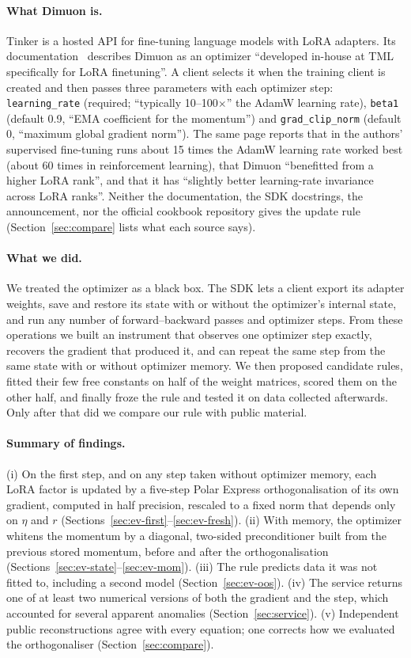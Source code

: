 \documentclass[11pt]{article}
\begin{document}
\paragraph{What Dimuon is.} Tinker is a hosted API for fine-tuning language models with LoRA
adapters. Its documentation~\cite{tinkerdocs} describes Dimuon as an optimizer ``developed
in-house at TML specifically for LoRA finetuning''. A client selects it when the training client is
created and then passes three parameters with each optimizer step: \texttt{learning\_rate}
(required; ``typically 10--100$\times$'' the AdamW learning rate), \texttt{beta1} (default 0.9,
``EMA coefficient for the momentum'') and \texttt{grad\_clip\_norm} (default 0, ``maximum global
gradient norm''). The same page reports that in the authors' supervised fine-tuning runs about
15 times the AdamW learning rate worked best (about 60 times in reinforcement learning), that Dimuon
``benefitted from a higher LoRA rank'', and that it has ``slightly better learning-rate invariance
across LoRA ranks''. Neither the documentation, the SDK docstrings, the announcement, nor the
official cookbook repository gives the update rule (Section~\ref{sec:compare} lists what each
source says).

\paragraph{What we did.} We treated the optimizer as a black box. The SDK lets a client export its
adapter weights, save and restore its state with or without the optimizer's internal state, and run
any number of forward--backward passes and optimizer steps. From these operations we built an
instrument that observes one optimizer step exactly, recovers the gradient that produced it, and
can repeat the same step from the same state with or without optimizer memory. We then proposed
candidate rules, fitted their few free constants on half of the weight matrices, scored them on the
other half, and finally froze the rule and tested it on data collected afterwards. Only after that
did we compare our rule with public material.

\paragraph{Summary of findings.} (i) On the first step, and on any step taken without optimizer
memory, each LoRA factor is updated by a five-step Polar Express orthogonalisation of its own
gradient, computed in half precision, rescaled to a fixed norm that depends only on $\eta$ and $r$
(Sections~\ref{sec:ev-first}--\ref{sec:ev-fresh}). (ii) With memory, the optimizer whitens the
momentum by a diagonal, two-sided preconditioner built from the previous stored momentum, before and
after the orthogonalisation (Sections~\ref{sec:ev-state}--\ref{sec:ev-mom}). (iii) The rule
predicts data it was not fitted to, including a second model (Section~\ref{sec:ev-oos}). (iv) The
service returns one of at least two numerical versions of both the gradient and the step, which
accounted for several apparent anomalies (Section~\ref{sec:service}). (v) Independent public
reconstructions agree with every equation; one corrects how we evaluated the orthogonaliser
(Section~\ref{sec:compare}).
\end{document}
